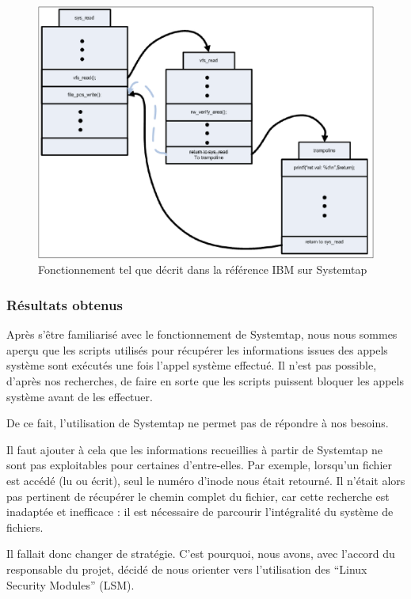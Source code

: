 \documentclass[pdftex,a4paper,titlepage,11pt,openright]{article}
\begin{document}
\begin{figure}[hb]
	\centering
	\includegraphics[scale=0.4]{attachements/kretprob.png}
	\caption{Fonctionnement tel que décrit dans la référence IBM sur Systemtap \cite{IBMRBST}}
\end{figure}

\subsubsection{Résultats obtenus}

Après s'être familiarisé avec le fonctionnement de Systemtap, nous nous sommes aperçu que les scripts utilisés pour récupérer les informations issues des appels système sont exécutés une fois l'appel système effectué. Il n'est pas possible, d'après nos recherches, de faire en sorte que les scripts puissent bloquer les appels système avant de les effectuer.

De ce fait, l'utilisation de Systemtap ne permet pas de répondre à nos besoins.

Il faut ajouter à cela que les informations recueillies à partir de Systemtap ne sont pas exploitables pour certaines d'entre-elles. Par exemple, lorsqu'un fichier est accédé (lu ou écrit), seul le numéro d'inode nous était retourné. Il n'était alors pas pertinent de récupérer le chemin complet du fichier, car cette recherche est inadaptée et inefficace : il est nécessaire de parcourir l'intégralité du système de fichiers.

Il fallait donc changer de stratégie. C'est pourquoi, nous avons, avec l'accord du responsable du projet, décidé de nous orienter vers l'utilisation des ``Linux Security Modules'' (LSM).
\end{document}
